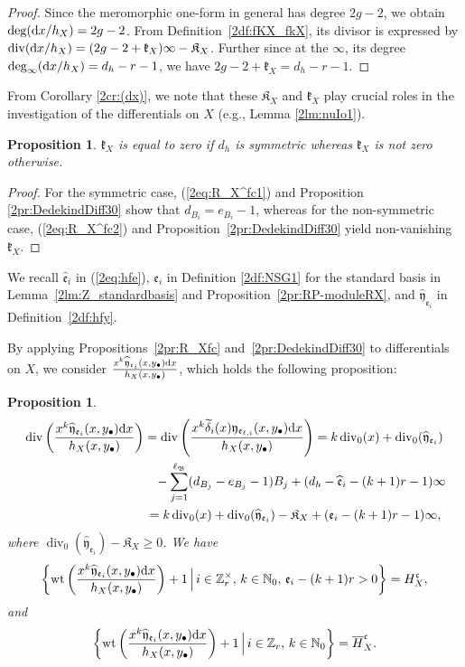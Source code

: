 \documentclass[pdftex]{sigma}
\def\ZZ{{\mathbb Z}}
\def\NN{{\mathbb N}}
\def\fB{{\mathfrak B}}
\def\fK{{\mathfrak K}}
\def\fc{{\mathfrak c}}
\def\fe{{\mathfrak e}}
\def\fk{{\mathfrak k}}
\def\fy{{\mathfrak y}}
\def\tdelta{{\widetilde \delta}}
\def\BH{{\overline H}}
\def\hfe{{\widehat{\mathfrak e}}}
\def\hfy{{\widehat{\mathfrak y}}}
\def\Div{\operatorname{div}}
\def\wt{{\mathrm {wt}}}
\numberwithin{equation}{section}
\newtheorem{Proposition}[Theorem]{Proposition}
 { \theoremstyle{definition}
\newtheorem{Definition}[Theorem]{Definition}
\newtheorem{Note}[Theorem]{Note}
\newtheorem{Example}[Theorem]{Example}
\newtheorem{Remark}[Theorem]{Remark} }
\begin{document}
\begin{proof}
Since the meromorphic one-form in general has degree $2g-2$, we obtain $\deg({\rm d} x/h_X)=2g-2$. From Definition~\ref{2df:fKX_fkX}, its divisor is expressed by $\Div({\rm d} x/h_X)=(2g-2+\fk_X)\infty-\fK_X$.
Further since at the $\infty$, its degree $\deg_\infty({\rm d} x/h_X)=d_h - r-1$, we have $2g-2+\fk_X=d_h - r- 1$.
\end{proof}

From Corollary \ref{2cr:(dx)}, we note that these $\fK_X$ and $\fk_X$ play crucial roles in the investigation of the differentials on $X$ (e.g., Lemma \ref{2lm:nuIo1}).

\begin{Proposition}\label{2pr:fK_X}
$\fk_X$ is equal to zero if $d_h$ is symmetric whereas $\fk_X$ is not zero otherwise.
\end{Proposition}

\begin{proof}
For the symmetric case, (\ref{2eq:R_X^fc1}) and Proposition \ref{2pr:DedekindDiff30} show that $d_{B_i}=e_{B_i}-1$, whereas for the non-symmetric case, (\ref{2eq:R_X^fc2}) and Proposition~\ref{2pr:DedekindDiff30} yield non-vanishing $\fk_X$.
\end{proof}

We recall $\hfe_i$ in (\ref{2eq:hfe}), $\fe_i$ in Definition \ref{2df:NSG1} for the standard basis in Lemma~\ref{2lm:Z_standardbasis} and Proposition~\ref{2pr:RP-moduleRX}, and $\hfy_{\fe_i}$ in Definition~\ref{2df:hfy}.

By applying Propositions~\ref{2pr:R_Xfc} and~\ref{2pr:DedekindDiff30} to differentials on $X$, we consider $\frac{x^k \hfy_{\fe_i}(x,y_\bullet) {\rm d} x}{h_X(x,y_\bullet)}$, which holds the following proposition:

\begin{Proposition}\label{2pr:phi_hi}
\begin{gather*}
\Div\left(\frac{x^k \hfy_{\fe_i}(x,y_\bullet) {\rm d} x}
 {h_X(x,y_\bullet)}\right)
= \Div\left(\frac{x^k \tdelta_i(x)\fy_{\fe_{\ell,i}}(x,y_\bullet) {\rm d} x}
 {h_X(x,y_\bullet)}\right)=k\Div_0(x)+\Div_0(\hfy_{\fe_i})
\\
\hphantom{\Div\left(\frac{x^k \hfy_{\fe_i}(x,y_\bullet) {\rm d} x}
 {h_X(x,y_\bullet)}\right)=}{}
-\sum_{j=1}^{\ell_{\fB}} (d_{B_j}-e_{B_j} -1) B_j
+(d_h - \hfe_{i}-(k+1)r-1) \infty\\
\hphantom{\Div\left(\frac{x^k \hfy_{\fe_i}(x,y_\bullet) {\rm d} x}
 {h_X(x,y_\bullet)}\right)}{}
=k\Div_0(x)+\Div_0(\hfy_{\fe_i})-\fK_X+(\fe_{i}-(k+1)r-1) \infty,
\end{gather*}
where $\Div_0(\hfy_{\fe_i})-\fK_X\ge0$.
We have
\[
\left\{
\wt
\left(\frac{x^k \hfy_{\fe_i}(x,y_\bullet) {\rm d} x}{h_X(x,y_\bullet)}\right)+1 \,
\Bigr| \, i \in \ZZ_r^\times,\, k\in \NN_0,\, \fe_{i}-(k+1)r>0\right\}
=H_X^\fc,
\]
and
\[
\left\{
\wt
\left(\frac{x^k \hfy_{\fe_i}(x,y_\bullet) {\rm d} x}{h_X(x,y_\bullet)}\right)+1 \,
\Bigr| \, i \in \ZZ_r,\, k\in \NN_0\right\}
=\BH_X^\fc.
\]
\end{Proposition}
\end{document}
